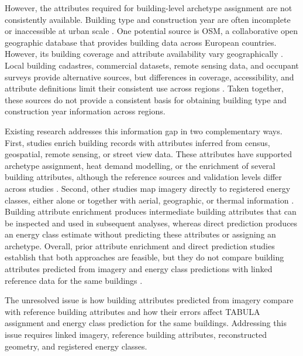 However, the attributes required for building-level archetype assignment are not consistently available. Building type and construction year are often incomplete or inaccessible at urban scale \parencite{milojevicdupont2023,dabrock2025}. One potential source is \Ac{OSM}, a collaborative open geographic database that provides building data across European countries. However, its building coverage and attribute availability vary geographically \parencite{milojevicdupont2023}. Local building cadastres, commercial datasets, remote sensing data, and occupant surveys provide alternative sources, but differences in coverage, accessibility, and attribute definitions limit their consistent use across regions \parencite{dabrock2025}. Taken together, these sources do not provide a consistent basis for obtaining building type and construction year information across regions.

Existing research addresses this information gap in two complementary ways. First, studies enrich building records with attributes inferred from census, geospatial, remote sensing, or street view data. These attributes have supported archetype assignment, heat demand modelling, or the enrichment of several building attributes, although the reference sources and validation levels differ across studies \parencite{dabrock2025,wurm2021,liang2025}. Second, other studies map imagery directly to registered energy classes, either alone or together with aerial, geographic, or thermal information \parencite{mayer2023uk,mayer2023dk,liu2025,sun2026,pan_nd}. Building attribute enrichment produces intermediate building attributes that can be inspected and used in subsequent analyses, whereas direct prediction produces an energy class estimate without predicting these attributes or assigning an archetype. Overall, prior attribute enrichment and direct prediction studies establish that both approaches are feasible, but they do not compare building attributes predicted from imagery and energy class predictions with linked reference data for the same buildings \parencite{dabrock2025,wurm2021,liang2025,mayer2023uk,mayer2023dk,liu2025,sun2026,pan_nd}.

The unresolved issue is how building attributes predicted from imagery compare with reference building attributes and how their errors affect \ac{TABULA} assignment and energy class prediction for the same buildings. Addressing this issue requires linked imagery, reference building attributes, reconstructed geometry, and registered energy classes.

